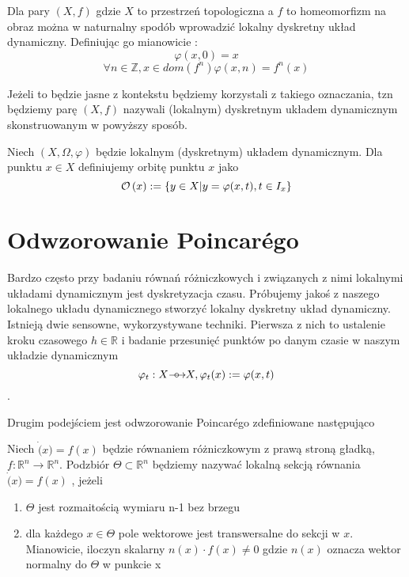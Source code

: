   Dla pary $(X,f) $ gdzie $X$ to przestrzeń topologiczna a $ f $ to homeomorfizm na obraz można w naturnalny spodób wprowadzić 
  lokalny dyskretny układ dynamiczny. Definiując go mianowicie :
  $$
        \varphi(x,0) = x  $$ 
        $$
         \forall n \in \mathbb Z , x \in dom(f^n) \varphi(x,n) = f^n(x)
  $$
  
  Jeżeli to będzie jasne z kontekstu będziemy korzystali z takiego oznaczania, tzn będziemy parę $(X,f)$ nazywali 
  (lokalnym) dyskretnym układem dynamicznym skonstruowanym w powyższy sposób.

  \begin{definition}
   Niech $(X,\Omega,\varphi) $ będzie lokalnym (dyskretnym) układem dynamicznym. Dla punktu $ x \in X $ definiujemy orbitę punktu
   $ x $ jako 
   $$
	\mathcal O\left(x\right) := \{ y \in X |  y = \varphi(x,t) , t \in I_x\}
   $$
  \end{definition}
  
  \section{Odwzorowanie Poincar\'ego}
  
  Bardzo często przy badaniu równań różniczkowych i związanych z nimi lokalnymi układami dynamicznym jest dyskretyzacja czasu.
  Próbujemy jakoś z naszego lokalnego układu dynamicznego stworzyć lokalny dyskretny układ dynamiczny. Istnieją dwie sensowne, wykorzystywane
  techniki. Pierwsza z nich to ustalenie kroku czasowego $ h \in \mathbb R $ i badanie przesunięć punktów po danym czasie w naszym układzie dynamicznym
  $$
    \varphi_t : X {\mathrel{\longrightarrow\mkern-25mu\circ}\;\;} X,  \varphi_t(x) := \varphi(x,t)
  $$.
  
  Drugim podejściem jest odwzorowanie Poincar\'ego zdefiniowane następująco
  
  \begin{definition}
    Niech $\dot(x) = f(x)$ będzie równaniem różniczkowym z prawą stroną gładką, $ f : \mathbb R^n \to \mathbb R^n$. Podzbiór $ \Theta \subset \mathbb R^n $ 
    będziemy nazywać lokalną sekcją równania $ \dot(x) = f(x) $ , jeżeli
    
    \begin{enumerate}
     \item $ \Theta $ jest rozmaitością wymiaru n-1 bez brzegu
     \item dla każdego $ x \in \Theta$ pole wektorowe jest transwersalne do sekcji w $x$.
     Mianowicie, iloczyn skalarny $n(x) \cdot f(x) \neq 0 $ gdzie $n(x)$ oznacza wektor normalny do $ \Theta $ w punkcie x
    \end{enumerate}

  \end{definition}
  
